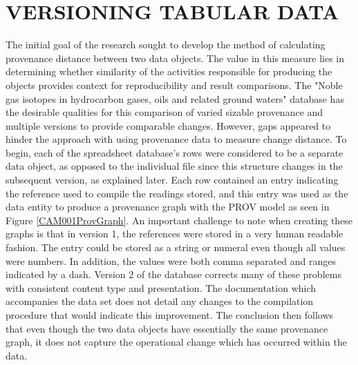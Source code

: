
\chapter{VERSIONING TABULAR DATA}\label{ch:spreadsheet}

The initial goal of the research sought to develop the method of calculating provenance distance between two data objects.
The value in this measure lies in determining whether similarity of the activities responsible for producing the objects provides context for reproducibility and result comparisons.
The "Noble gas isotopes in hydrocarbon gases, oils and related ground waters" database has the desirable qualities for this comparison of varied sizable provenance and multiple versions to provide comparable changes.
However, gaps appeared to hinder the approach with using provenance data to measure change distance.
To begin, each of the spreadsheet database's rows were considered to be a separate data object, as opposed to the individual file since this structure changes in the subsequent version, as explained later.
Each row contained an entry indicating the reference used to compile the readings stored, and this entry was used as the data entity to produce a provenance graph with the PROV model as seen in Figure \ref{CAM001ProvGraph}.
An important challenge to note when creating these graphs is that in version 1, the references were stored in a very human readable fashion.
The entry could be stored as a string or numeral even though all values were numbers.
In addition, the values were both comma separated and ranges indicated by a dash.
Version 2 of the database corrects many of these problems with consistent content type and presentation.
The documentation which accompanies the data set does not detail any changes to the compilation procedure that would indicate this improvement.
The conclusion then follows that even though the two data objects have essentially the same provenance graph, it does not capture the operational change which has occurred within the data.

